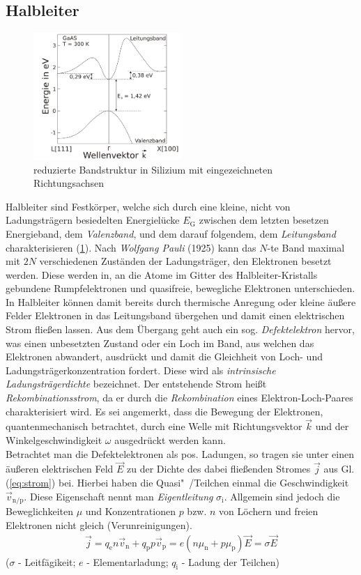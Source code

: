 \documentclass[numbers=noenddot,14pt,a4paper]{scrartcl}
\newcommand{\ix}[1]{_\text{#1}}
\newcommand{\tilt}[1]{\textit{#1}}
\begin{document}
\subsection{Halbleiter}
\begin{figure}
	\includegraphics[width=0.5\textwidth]{Bandstruktur_GaAs.png}
	\caption{reduzierte Bandstruktur in Silizium mit eingezeichneten Richtungsachsen}
	 \label{img:band}
\end{figure}
Halbleiter sind Festkörper, welche sich durch eine kleine, nicht von Ladungsträgern besiedelten Energielücke $E\ix{G}$ zwischen dem letzten besetzen Energieband, dem \tilt{Valenzband}, und dem darauf folgendem, dem \tilt{Leitungsband} charakterisieren (\ref{img:band}). Nach \tilt{Wolfgang Pauli} (1925) kann das $N$-te Band maximal mit $2N$ verschiedenen Zuständen der Ladungsträger, den Elektronen besetzt werden. Diese werden in, an die Atome im Gitter des Halbleiter-Kristalls gebundene Rumpfelektronen und quasifreie, bewegliche Elektronen unterschieden.\\
In Halbleiter können damit bereits durch thermische Anregung oder kleine äußere Felder Elektronen in das Leitungsband übergehen und damit einen elektrischen Strom fließen lassen. Aus dem Übergang geht auch ein sog. \tilt{Defektelektron} hervor, was einen unbesetzten Zustand oder ein Loch im Band, aus welchen das Elektronen abwandert, ausdrückt und damit die Gleichheit von Loch- und Ladungsträgerkonzentration fordert. Diese wird als \tilt{intrinsische Ladungsträgerdichte} bezeichnet. Der entstehende Strom heißt \tilt{Rekombinationsstrom}, da er durch die \tilt{Rekombination} eines Elektron-Loch-Paares charakterisiert wird. Es sei angemerkt, dass die Bewegung der Elektronen, quantenmechanisch betrachtet, durch eine Welle mit Richtungsvektor $\vec{k}$ und der Winkelgeschwindigkeit $\omega$ ausgedrückt werden kann.\\
Betrachtet man die Defektelektronen als pos. Ladungen, so tragen sie unter einen äußeren elektrischen Feld $\vec{E}$ zu der Dichte des dabei fließenden Stromes $\vec{j}$ aus Gl. (\ref{eq:strom}) bei. Hierbei haben die Quasi"~/Teilchen einmal die Geschwindigkeit $\vec{v}\ix{n/p}$. Diese Eigenschaft nennt man \tilt{Eigentleitung} $\sigma\ix{i}$. Allgemein sind jedoch die Beweglichkeiten $\mu$ und Konzentrationen $p$ bzw. $n$ von Löchern und freien Elektronen nicht gleich (Verunreinigungen).
\begin{align}
	\vec{j}=q\ix{e}n\vec{v}\ix{n}+q\ix{p}p\vec{v}\ix{p}=e\left(n\mu\ix{n}+p\mu\ix{p}\right)\vec{E}=\sigma\vec{E} \label{eq:strom}
\end{align}
($\sigma$ - Leitfägikeit; $e$ - Elementarladung; $q\ix{i}$ - Ladung der Teilchen)
\end{document}
